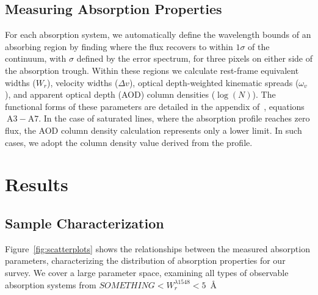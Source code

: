 \documentclass[linenumbers,twocolumn]{aastex61}
\begin{document}

\subsection{Measuring Absorption Properties}
\label{sec:measuring}

For each absorption system, we automatically define the wavelength bounds of an absorbing region by finding where the flux recovers to within $1\sigma$ of the continuum, with $\sigma$ defined by the error spectrum, for three pixels on either side of the absorption trough. Within these regions we calculate rest-frame equivalent widths ($W_r$), velocity widths ($\Delta v$), optical depth-weighted kinematic spreads ($\omega_v$), and apparent optical depth (AOD) column densities ($\log(N)$). The functional forms of these parameters are detailed in the appendix of~\cite{Churchill2001}, equations$~\mathrm{A3 - A7}$. In the case of saturated lines, where the absorption profile reaches zero flux, the AOD column density calculation represents only a lower limit. In such cases, we adopt the column density value derived from the {} profile.


\section{Results}
\label{sec:results}

\subsection{Sample Characterization}
\label{sec:sample}

\begin{figure*}[bth]
\caption{Correlations between measured absorption properties for survey sample. $\log N$ is the AOD column density, $\omega_v$ is the kinematic spread, $W_r^{1548}$ is the rest frame {} equivalent width, and $z$ is the absorption redshift.}
\label{fig:scatterplots}
\end{figure*}

Figure~\ref{fig:scatterplots} shows the relationships between the measured absorption parameters, characterizing the distribution of absorption properties for our survey. We cover a large parameter space, examining all types of observable absorption systems from $SOMETHING < W_r^{\lambda1548} < 5$~{\AA}
\end{document}

